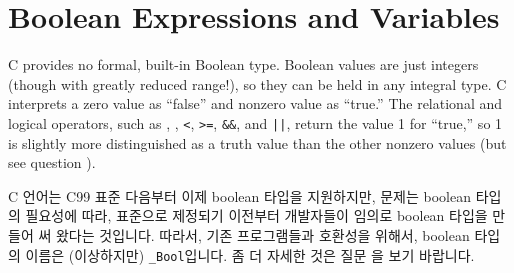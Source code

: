\chapter{Boolean Expressions and Variables}	\label{chap:boolexpr}

C provides no formal, built-in Boolean type. Boolean values are just integers
(though with greatly reduced range!), so they can be held in any integral type.
C interprets a zero value as ``false'' and  nonzero value as ``true.''
The relational and logical operators, such as \TT{==}, \TT{!=}, \verb+<+,
\verb+>=+, \verb+&&+, and \verb+||+, return the value 1 for ``true,'' so
1 is slightly more distinguished as a truth value than the other nonzero
values (but see question ).

C 언어는 C99 표준 다음부터 이제 boolean 타입을 지원하지만, 문제는 boolean
타입의 필요성에 따라, 표준으로 제정되기 이전부터 개발자들이 임의로 boolean
타입을 만들어 써 왔다는 것입니다. 따라서, 기존 프로그램들과 호환성을 위해서,
boolean 타입의 이름은 (이상하지만) \verb+_Bool+입니다. 좀 더 자세한 것은
질문 을 보기 바랍니다.

